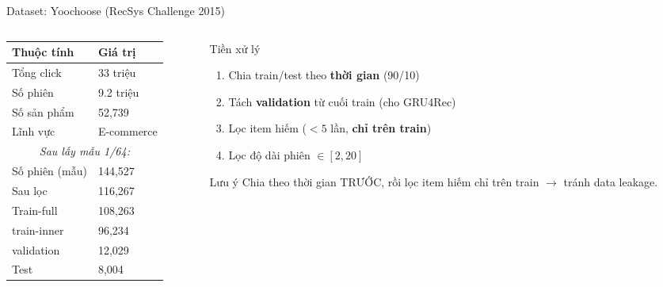 \documentclass[aspectratio=169, 11pt]{beamer}
\begin{document}
\begin{frame}{Dataset: Yoochoose (RecSys Challenge 2015)}
\begin{columns}
\begin{column}{0.5\textwidth}
\begin{table}
\centering
\small
\begin{tabular}{ll}
\toprule
\textbf{Thuộc tính} & \textbf{Giá trị} \\
\midrule
Tổng click & 33 triệu \\
Số phiên & 9.2 triệu \\
Số sản phẩm & 52,739 \\
Lĩnh vực & E-commerce \\
\midrule
\multicolumn{2}{c}{\textit{Sau lấy mẫu 1/64:}} \\
\midrule
Số phiên (mẫu) & 144,527 \\
Sau lọc & 116,267 \\
Train-full & 108,263 \\
\quad train-inner & 96,234 \\
\quad validation & 12,029 \\
Test & 8,004 \\
\bottomrule
\end{tabular}
\end{table}
\end{column}

\begin{column}{0.45\textwidth}
\begin{block}{Tiền xử lý}
\begin{enumerate}
    \item Chia train/test theo \textbf{thời gian} (90/10)
    \item Tách \textbf{validation} từ cuối train (cho GRU4Rec)
    \item Lọc item hiếm ($<5$ lần, \textbf{chỉ trên train})
    \item Lọc độ dài phiên $\in [2,20]$
\end{enumerate}
\end{block}

\vspace{0.3cm}
\begin{alertblock}{Lưu ý}
Chia theo thời gian TRƯỚC, rồi lọc item hiếm chỉ trên train $\rightarrow$ tránh data leakage.
\end{alertblock}
\end{column}
\end{columns}
\end{frame}
\end{document}
